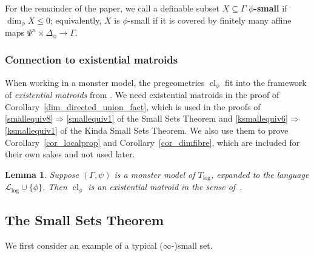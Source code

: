 \documentclass[11pt]{amsart}
\theoremstyle{plain}
\newtheorem{lemma}[thm]{Lemma}
\theoremstyle{definition}
\numberwithin{equation}{section}
\newcommand\calL{\mathcal{L}}
\newcommand\0{\varnothing}
\DeclareMathOperator\cl{cl}
\begin{document}
\noindent
For the remainder of the paper, we call a definable subset $X \subseteq \Gamma$ \textbf{$\phi$-small} if $\dim_\phi X \leq 0$; equivalently, $X$ is $\phi$-small if it  is covered by finitely many affine maps $\Psi^n\times\Delta_{\phi} \to \Gamma$. 



\subsubsection*{Connection to existential matroids}\label{existential_matroids_remark}
When working in a monster model, the pregeometries $\cl_{\phi}$ fit into the framework of \emph{existential matroids} from \cite{fornasiero-dimmatroiddense}.
We need existential matroids in the proof of Corollary~\ref{dim_directed_union_fact}, which is used in the proofs of \eqref{smallequiv8}$\Rightarrow$\eqref{smallequiv1} of the Small Sets Theorem and \eqref{ksmallequiv6}$\Rightarrow$\eqref{ksmallequiv1} of the Kinda Small Sets Theorem.
We also use them to prove Corollary~\ref{cor_localprop} and Corollary~\ref{cor_dimfibre}, which are included for their own sakes and not used later.


\begin{lemma}\label{lem_existentialmat}
Suppose $(\Gamma,\psi)$ is a monster model of $T_{\log}$, expanded to the language $\calL_{\log}\cup\{\phi\}$. Then $\cl_{\phi}$ is an existential matroid in the sense of~\cite{fornasiero-dimmatroiddense}.
\end{lemma}


\subsection{The Small Sets Theorem}\label{subsec_sststatement} 
We first consider an example of a typical ($\infty$-)small set.
\end{document}
